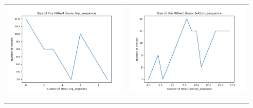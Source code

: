 \documentclass[10pt]{article}
\begin{document}
\begin{tabular}{c|c}
\begin{minipage}{.45\textwidth}
\includegraphics[width=\textwidth]{"DATA/4d/5 generators 2 bound C/top_sequence SIZE"}
\end{minipage} &
\begin{minipage}{.45\textwidth}
\includegraphics[width=\textwidth]{"DATA/4d/5 generators 2 bound C bottomup/bottom_sequence SIZE"}
\end{minipage} \\ \\
\hline \\\begin{minipage}{.45\textwidth}

\end{minipage}
\end{tabular}
\end{document}
